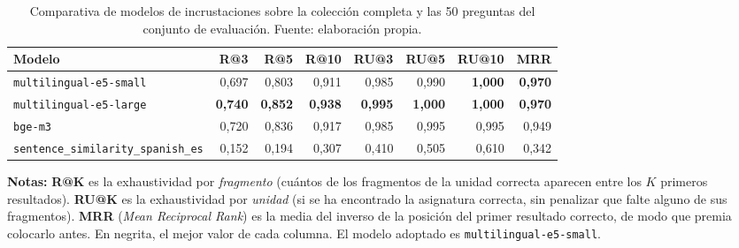 
\begin{table}[htbp]
  \centering
  \small
  \caption[Comparativa de modelos de incrustaciones]{Comparativa de modelos de
    incrustaciones sobre la colección completa y las 50 preguntas del
    conjunto de evaluación.
    Fuente: elaboración propia.}
  \label{tab:comparativa_embeddings}

  \setlength{\tabcolsep}{4pt}
  \begin{tabular}{@{}lrrrrrrr@{}}
    \toprule
    \textbf{Modelo}                            & \textbf{R@3}   & \textbf{R@5}   & \textbf{R@10}
                                               & \textbf{RU@3}  & \textbf{RU@5}  & \textbf{RU@10} & \textbf{MRR}   \\
    \midrule
    \texttt{multilingual-e5-small}             & 0,697          & 0,803          & 0,911
                                               & 0,985          & 0,990          & \textbf{1,000} & \textbf{0,970} \\
    \texttt{multilingual-e5-large}             & \textbf{0,740} & \textbf{0,852} & \textbf{0,938}
                                               & \textbf{0,995} & \textbf{1,000} & \textbf{1,000} & \textbf{0,970} \\
    \texttt{bge-m3}                            & 0,720          & 0,836          & 0,917
                                               & 0,985          & 0,995          & 0,995          & 0,949          \\
    \texttt{sentence\_similarity\_spanish\_es} & 0,152          & 0,194          & 0,307
                                               & 0,410          & 0,505          & 0,610          & 0,342          \\
    \bottomrule
  \end{tabular}
  \begin{minipage}{0.95\textwidth}
    \vspace{4pt}
    \tiny
    \textbf{Notas:} \textbf{R@K} es la exhaustividad por \emph{fragmento} (cuántos de los
    fragmentos de la unidad correcta aparecen entre los $K$ primeros resultados).
    \textbf{RU@K} es la exhaustividad por \emph{unidad} (si se ha encontrado la asignatura
    correcta, sin penalizar que falte alguno de sus fragmentos). \textbf{MRR}
    (\textit{Mean Reciprocal Rank}) es la media del inverso de la posición del primer resultado
    correcto, de modo que premia colocarlo antes. En negrita, el mejor valor de cada
    columna. El
    modelo adoptado es \texttt{multilingual-e5-small}.
  \end{minipage}
\end{table}
